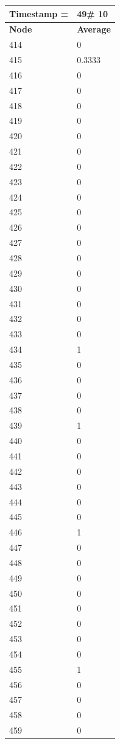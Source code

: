 \begin{tabular}{|l||l|}
\hline
\textbf{Timestamp =} & \textbf{49}\# 10\\\hline
	\textbf{Node} & \textbf{Average} \\ \hline
\hline
	414 & 0 \\ \hline
	415 & 0.3333 \\ \hline
	416 & 0 \\ \hline
	417 & 0 \\ \hline
	418 & 0 \\ \hline
	419 & 0 \\ \hline
	420 & 0 \\ \hline
	421 & 0 \\ \hline
	422 & 0 \\ \hline
	423 & 0 \\ \hline
	424 & 0 \\ \hline
	425 & 0 \\ \hline
	426 & 0 \\ \hline
	427 & 0 \\ \hline
	428 & 0 \\ \hline
	429 & 0 \\ \hline
	430 & 0 \\ \hline
	431 & 0 \\ \hline
	432 & 0 \\ \hline
	433 & 0 \\ \hline
	434 & 1 \\ \hline
	435 & 0 \\ \hline
	436 & 0 \\ \hline
	437 & 0 \\ \hline
	438 & 0 \\ \hline
	439 & 1 \\ \hline
	440 & 0 \\ \hline
	441 & 0 \\ \hline
	442 & 0 \\ \hline
	443 & 0 \\ \hline
	444 & 0 \\ \hline
	445 & 0 \\ \hline
	446 & 1 \\ \hline
	447 & 0 \\ \hline
	448 & 0 \\ \hline
	449 & 0 \\ \hline
	450 & 0 \\ \hline
	451 & 0 \\ \hline
	452 & 0 \\ \hline
	453 & 0 \\ \hline
	454 & 0 \\ \hline
	455 & 1 \\ \hline
	456 & 0 \\ \hline
	457 & 0 \\ \hline
	458 & 0 \\ \hline
	459 & 0 \\ \hline
\end{tabular}
